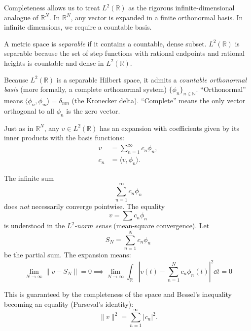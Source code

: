 Completeness allows us to treat $L^2(\mathbb{R})$ as the rigorous infinite-dimensional analogue of $\mathbb{R}^N$. In $\mathbb{R}^N$, any vector is expanded in a finite orthonormal basis. In infinite dimensions, we require a countable basis.

\begin{definition}[Separability]
A metric space is \textit{separable} if it contains a countable, dense subset. $L^2(\mathbb{R})$ is separable because the set of step functions with rational endpoints and rational heights is countable and dense in $L^2(\mathbb{R})$.
\end{definition}

Because $L^2(\mathbb{R})$ is a separable Hilbert space, it admits a \textit{countable orthonormal basis} (more formally, a complete orthonormal system) $\{\phi_n\}_{n \in \mathbb{N}}$. ``Orthonormal'' means $\langle \phi_n, \phi_m \rangle = \delta_{nm}$ (the Kronecker delta). ``Complete'' means the only vector orthogonal to all $\phi_n$ is the zero vector.

Just as in $\mathbb{R}^N$, any $v \in L^2(\mathbb{R})$ has an expansion with coefficients given by its inner products with the basis functions:
\begin{equation}
\begin{aligned}
v &= \sum_{n=1}^\infty c_n \phi_n, \\
c_n &= \langle v, \phi_n \rangle.
\end{aligned}
\end{equation}

\begin{remark}
The infinite sum \[
\sum_{n=1}^\infty c_n \phi_n
\] does \textit{not} necessarily converge pointwise. The equality \[
v = \sum c_n \phi_n
\] is understood in the \textit{$L^2$-norm sense} (mean-square convergence). Let
\[
S_N = \sum_{n=1}^N c_n \phi_n
\]
be the partial sum. The expansion means:
\begin{equation}
\lim_{N \to \infty} \left\| v - S_N \right\| = 0 \implies \lim_{N \to \infty} \int_\mathbb{R} \left| v(t) - \sum_{n=1}^N c_n \phi_n(t) \right|^2 \dd t = 0
\end{equation}

This is guaranteed by the completeness of the space and Bessel's inequality becoming an equality (Parseval's identity):
\[
\|v\|^2 = \sum_{n=1}^\infty |c_n|^2.
\]

\end{remark}



